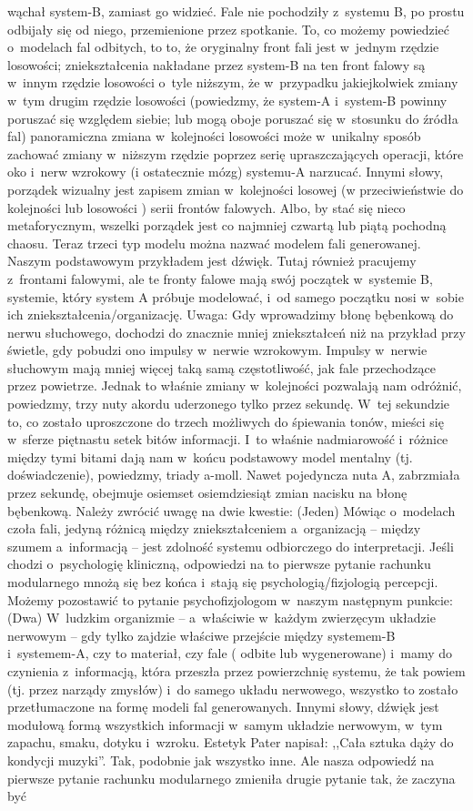 \documentclass[oneside,polish,11pt,rmheadings]{mwbk}
\begin{document}
wąchał system-B, zamiast go widzieć. Fale nie pochodziły z~systemu B, po prostu odbijały się od niego, przemienione przez spotkanie. To, co możemy powiedzieć o~modelach fal odbitych, to to, że oryginalny front fali jest w~jednym rzędzie losowości; zniekształcenia nakładane przez system-B na ten front falowy są w~innym rzędzie losowości o~tyle niższym, że w~przypadku jakiejkolwiek zmiany w~tym drugim rzędzie losowości (powiedzmy, że system-A i~system-B powinny poruszać się względem siebie; lub mogą oboje poruszać się w~stosunku do źródła fal) panoramiczna zmiana w~kolejności losowości może w~unikalny sposób zachować zmiany w~niższym rzędzie poprzez serię upraszczających operacji, które oko i~nerw wzrokowy (i ostatecznie mózg) systemu-A narzucać. Innymi słowy, porządek wizualny jest zapisem zmian w~kolejności losowej (w przeciwieństwie do kolejności lub losowości ) serii frontów falowych. Albo, by stać się nieco metaforycznym, wszelki porządek jest co najmniej czwartą lub piątą pochodną chaosu. Teraz trzeci typ modelu można nazwać modelem fali generowanej. Naszym podstawowym przykładem jest dźwięk. Tutaj również pracujemy z~frontami falowymi, ale te fronty falowe mają swój początek w~systemie B, systemie, który system A próbuje modelować, i~od samego początku nosi w~sobie ich zniekształcenia/organizację. Uwaga: Gdy wprowadzimy błonę bębenkową do nerwu słuchowego, dochodzi do znacznie mniej zniekształceń niż na przykład przy świetle, gdy pobudzi ono impulsy w~nerwie wzrokowym. Impulsy w~nerwie słuchowym mają mniej więcej taką samą częstotliwość, jak fale przechodzące przez powietrze. Jednak to właśnie zmiany w~kolejności pozwalają nam odróżnić, powiedzmy, trzy nuty akordu uderzonego tylko przez sekundę. W~tej sekundzie to, co zostało uproszczone do trzech możliwych do śpiewania tonów, mieści się w~sferze piętnastu setek bitów informacji. I~to właśnie nadmiarowość i~różnice między tymi bitami dają nam w~końcu podstawowy model mentalny (tj. doświadczenie), powiedzmy, triady a-moll. Nawet pojedyncza nuta A, zabrzmiała przez sekundę, obejmuje osiemset osiemdziesiąt zmian nacisku na błonę bębenkową. Należy zwrócić uwagę na dwie kwestie: (Jeden) Mówiąc o~modelach czoła fali, jedyną różnicą między zniekształceniem a~organizacją -- między szumem a~informacją -- jest zdolność systemu odbiorczego do interpretacji. Jeśli chodzi o~psychologię kliniczną, odpowiedzi na to pierwsze pytanie rachunku modularnego mnożą się bez końca i~stają się psychologią/fizjologią percepcji. Możemy pozostawić to pytanie psychofizjologom w~naszym następnym punkcie: (Dwa) W~ludzkim organizmie -- a~właściwie w~każdym zwierzęcym układzie nerwowym -- gdy tylko zajdzie właściwe przejście między systemem-B i~systemem-A, czy to materiał, czy fale ( odbite lub wygenerowane) i~mamy do czynienia z~informacją, która przeszła przez powierzchnię systemu, że tak powiem (tj. przez narządy zmysłów) i~do samego układu nerwowego, wszystko to zostało przetłumaczone na formę modeli fal generowanych. Innymi słowy, dźwięk jest modułową formą wszystkich informacji w~samym układzie nerwowym, w~tym zapachu, smaku, dotyku i~wzroku. Estetyk Pater napisał: ,,Cała sztuka dąży do kondycji muzyki''. Tak, podobnie jak wszystko inne. Ale nasza odpowiedź na pierwsze pytanie rachunku modularnego zmieniła drugie pytanie tak, że zaczyna być 
\end{document}
